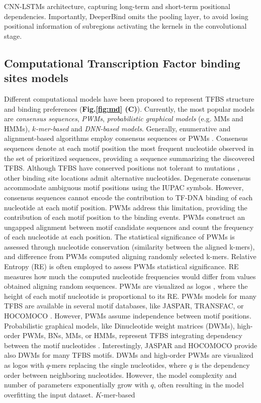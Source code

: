 \documentclass[a4paper, titlepage, openright]{book}
\begin{document}
CNN-LSTMs architecture, capturing long-term and short-term positional dependencies. Importantly, DeeperBind omits the pooling layer, to avoid losing positional information of subregions activating the kernels in the convolutional stage.
\subsection{Computational Transcription Factor binding sites models}
Different computational models have been proposed to represent TFBS structure and binding preferences (\textbf{Fig.\ref{fig:md} (C)}). Currently, the most popular models are \emph{consensus sequences}, \emph{PWMs}, \emph{probabilistic graphical models} (e.g. MMs and HMMs), \emph{$k$-mer-based} and \emph{DNN-based models}. Generally, enumerative and alignment-based algorithms employ consensus sequences \citep{day1992critical} or PWMs \citep{stormo2000dna,stormo2013modeling}. Consensus sequences denote at each motif position the most frequent nucleotide observed in the set of prioritized sequences, providing a sequence summarizing the discovered TFBS. Although TFBS have conserved positions not tolerant to mutations \citep{li2015human}, other binding site locations admit alternative nucleotides. Degenerate consensus accommodate ambiguous motif positions using the IUPAC symbols. However, consensus sequences cannot encode the contribution to TF-DNA binding of each nucleotide at each motif position. PWMs address this limitation, providing the contribution of each motif position to the binding events. PWMs construct an ungapped alignment between motif candidate sequences and count the frequency of each nucleotide at each position. The statistical significance of PWMs is assessed through nucleotide conservation (similarity between the aligned k-mers), and difference from PWMs computed aligning randomly selected k-mers. Relative Entropy (RE) \citep{stormo1998information} is often employed to assess PWMs statistical significance. RE measures how much the computed nucleotide frequencies would differ from values obtained aligning random sequences. PWMs are visualized as logos \citep{schneider1990sequence}, where the height of each motif nucleotide is proportional to its RE. PWMs models for many TFBS are available in several motif databases, like JASPAR, TRANSFAC, or HOCOMOCO \citep{sandelin2004jaspar,fornes2020jaspar,wingender1996transfac,wingender2000transfac,kulakovskiy2013hocomoco,kulakovskiy2018hocomoco}. However, PWMs assume independence between motif positions. Probabilistic graphical models, like Dinucleotide weight matrices (DWMs), high-order PWMs, BNs, MMs, or HMMs, represent TFBS integrating dependency between the motif nucleotides \citep{siddharthan2010dinucleotide,korhonen2017fast,barash2003modeling,siebert2016bayesian}. Interestingly, JASPAR and HOCOMOCO provide also DWMs for many TFBS motifs. DWMs and high-order PWMs are visualized as logos with $q$-mers replacing the single nucleotides, where $q$ is the dependency order between neighboring nucleotides. However, the model complexity and number of parameters exponentially grow with $q$, often resulting in the model overfitting the input dataset. $K$-mer-based 
\end{document}
